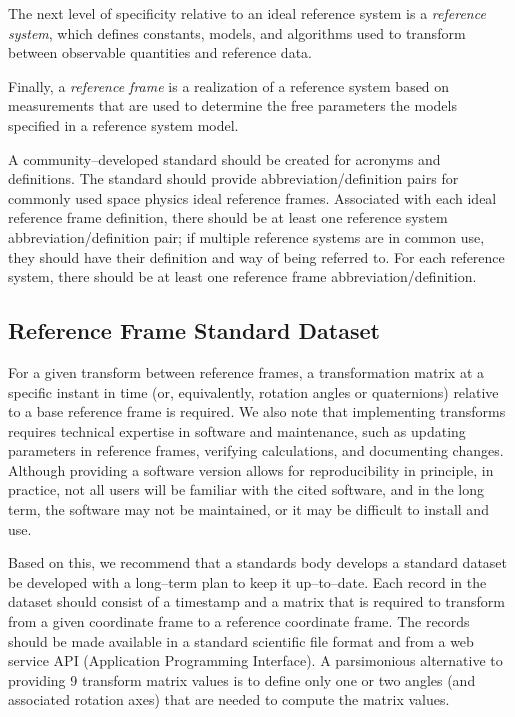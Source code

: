 \documentclass[draft]{agujournal2019}
\begin{document}
The next level of specificity relative to an ideal reference system is a {\it reference system}, which defines constants, models, and algorithms used to transform between observable quantities and reference data. 

Finally, a {\it reference frame} is a realization of a reference system based on measurements that are used to determine the free parameters the models specified in a reference system model. 

A community--developed standard should be created for acronyms and definitions. The standard should provide abbreviation/definition pairs for commonly used space physics ideal reference frames. Associated with each ideal reference frame definition, there should be at least one reference system abbreviation/definition pair; if multiple reference systems are in common use, they should have their definition and way of being referred to. For each reference system, there should be at least one reference frame abbreviation/definition.

\subsection{Reference Frame Standard Dataset}
\label{sect:reference-dataset}

For a given transform between reference frames, a transformation matrix at a specific instant in time (or, equivalently, rotation angles or quaternions) relative to a base reference frame is required. We also note that implementing transforms requires technical expertise in software and maintenance, such as updating parameters in reference frames, verifying calculations, and documenting changes. Although providing a software version allows for reproducibility in principle, in practice, not all users will be familiar with the cited software, and in the long term, the software may not be maintained, or it may be difficult to install and use. 

Based on this, we recommend that a standards body develops a standard dataset be developed with a long--term plan to keep it up--to--date. Each record in the dataset should consist of a timestamp and a matrix that is required to transform from a given coordinate frame to a reference coordinate frame. The records should be made available in a standard scientific file format and from a web service API (Application Programming Interface). A parsimonious alternative to providing 9 transform matrix values is to define only one or two angles (and associated rotation axes) that are needed to compute the matrix values.
\end{document}
